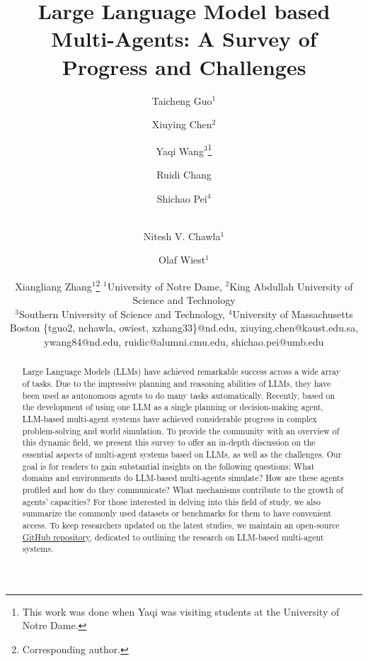 \documentclass{article}
\title{Large Language Model based Multi-Agents: A Survey of Progress and Challenges}
\author{
Taicheng Guo$^1$
\and
Xiuying Chen$^2$\and
Yaqi Wang$^3$\thanks{This work was done when Yaqi was visiting students at the University of Notre Dame.} \and
Ruidi Chang \and 
Shichao Pei$^4$ \and \\
Nitesh V. Chawla$^1$ \and
Olaf Wiest$^1$ \and
Xiangliang Zhang$^1$\thanks{Corresponding author.}
\affiliations
$^1$University of Notre Dame, $^2$King Abdullah University of Science and Technology\\
$^3$Southern University of Science and Technology,
$^4$University of Massachusetts Boston
\emails
\{tguo2, nchawla, owiest, xzhang33\}@nd.edu,
xiuying.chen@kaust.edu.sa,
ywang84@nd.edu, ruidic@alumni.cmu.edu, shichao.pei@umb.edu
}
\begin{document}
\maketitle

\begin{abstract}
Large Language Models (LLMs) have achieved remarkable success across a wide array of tasks. Due to the impressive planning and reasoning abilities of LLMs, they have been used as autonomous agents to do many tasks automatically. Recently, based on the development of using one LLM as a single planning or decision-making agent, LLM-based multi-agent systems have achieved considerable progress in complex problem-solving and world simulation. 
To provide the community with an overview of this dynamic field,  we present this survey to offer an in-depth discussion on the essential aspects of multi-agent systems based on LLMs, as well as the challenges. Our goal is for readers to gain substantial insights on the following questions: What domains and environments do LLM-based multi-agents simulate? How are these agents profiled and how do they communicate? What mechanisms contribute to the growth of agents' capacities? For those interested in delving into this field of study, we also summarize the commonly used datasets or benchmarks for them to have convenient access. To keep researchers updated on the latest studies,  we maintain an open-source \href{https://github.com/taichengguo/LLM_MultiAgents_Survey_Papers}{GitHub repository}, dedicated to outlining the research on LLM-based multi-agent systems. %

\end{abstract}











\appendix





\end{document}
